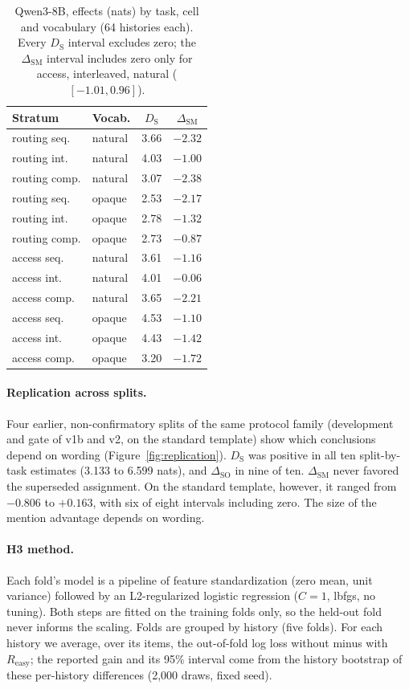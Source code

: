 \begin{table}[t]
\centering
\small
\setlength{\tabcolsep}{3pt}
\begin{tabular}{@{}llcc@{}}
\toprule
Stratum & Vocab. & $D_{\mathrm{S}}$ & $\Delta_{\mathrm{SM}}$ \\
\midrule
routing seq.  & natural & 3.66 & $-2.32$ \\
routing int.  & natural & 4.03 & $-1.00$ \\
routing comp. & natural & 3.07 & $-2.38$ \\
routing seq.  & opaque  & 2.53 & $-2.17$ \\
routing int.  & opaque  & 2.78 & $-1.32$ \\
routing comp. & opaque  & 2.73 & $-0.87$ \\
\midrule
access seq.   & natural & 3.61 & $-1.16$ \\
access int.   & natural & 4.01 & $-0.06$ \\
access comp.  & natural & 3.65 & $-2.21$ \\
access seq.   & opaque  & 4.53 & $-1.10$ \\
access int.   & opaque  & 4.43 & $-1.42$ \\
access comp.  & opaque  & 3.20 & $-1.72$ \\
\bottomrule
\end{tabular}
\caption{Qwen3-8B, effects (nats) by task, cell and vocabulary (64 histories each). Every $D_{\mathrm{S}}$ interval excludes zero; the $\Delta_{\mathrm{SM}}$ interval includes zero only for access, interleaved, natural ($[-1.01, 0.96]$).}
\label{tab:strata}
\end{table}

\paragraph{Replication across splits.} Four earlier, non-confirmatory splits of the same protocol family
(development and gate of v1b and v2, on the standard template) show
which conclusions depend on wording (Figure~\ref{fig:replication}). $D_{\mathrm{S}}$ was
positive in all ten split-by-task estimates (3.133 to 6.599 nats), and $\Delta_{\mathrm{SO}}$ in
nine of ten. $\Delta_{\mathrm{SM}}$ never favored the superseded assignment. On the standard template,
however, it ranged from $-0.806$ to $+0.163$, with six of eight intervals including zero. The size of the
mention advantage depends on wording.

\paragraph{H3 method.} Each fold's model is a pipeline of feature standardization (zero mean, unit
variance) followed by an L2-regularized logistic regression ($C=1$, lbfgs, no tuning). Both steps are fitted
on the training folds only, so the held-out fold never informs the scaling. Folds are grouped by history
(five folds). For each history we average, over its items, the out-of-fold log loss without minus with
$R_{\mathrm{easy}}$; the reported gain and its 95\% interval come from the history bootstrap of these
per-history differences (2{,}000 draws, fixed seed).

